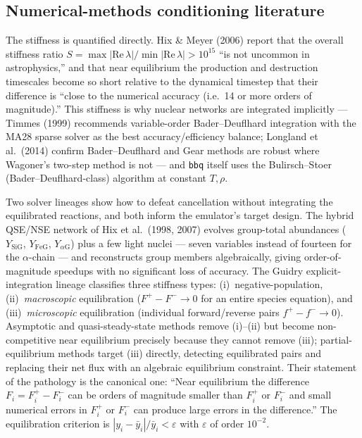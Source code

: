 \documentclass[11pt]{article}
\begin{document}
\subsection{Numerical-methods conditioning literature}

The stiffness is quantified directly. Hix \& Meyer (2006) report that the overall stiffness ratio $S = \max|\mathrm{Re}\,\lambda|/\min|\mathrm{Re}\,\lambda| > 10^{15}$ ``is not uncommon in astrophysics,'' and that near equilibrium the production and destruction timescales become so short relative to the dynamical timestep that their difference is ``close to the numerical accuracy (i.e.\ 14 or more orders of magnitude).'' This stiffness is why nuclear networks are integrated implicitly --- Timmes (1999) recommends variable-order Bader--Deuflhard integration with the MA28 sparse solver as the best accuracy/efficiency balance; Longland et al.\ (2014) confirm Bader--Deuflhard and Gear methods are robust where Wagoner's two-step method is not --- and \texttt{bbq} itself uses the Bulirsch--Stoer (Bader--Deuflhard-class) algorithm at constant $T, \rho$.

Two solver lineages show how to defeat cancellation without integrating the equilibrated reactions, and both inform the emulator's target design. The hybrid QSE/NSE network of Hix et al.\ (1998, 2007) evolves group-total abundances ($Y_{\mathrm{SiG}}$, $Y_{\mathrm{FeG}}$, $Y_{\alpha\mathrm{G}}$) plus a few light nuclei --- seven variables instead of fourteen for the $\alpha$-chain --- and reconstructs group members algebraically, giving order-of-magnitude speedups with no significant loss of accuracy. The Guidry explicit-integration lineage classifies three stiffness types: (i)~negative-population, (ii)~\emph{macroscopic} equilibration ($F^+ - F^- \to 0$ for an entire species equation), and (iii)~\emph{microscopic} equilibration (individual forward/reverse pairs $f^+ - f^- \to 0$). Asymptotic and quasi-steady-state methods remove (i)--(ii) but become non-competitive near equilibrium precisely because they cannot remove (iii); partial-equilibrium methods target (iii) directly, detecting equilibrated pairs and replacing their net flux with an algebraic equilibrium constraint. Their statement of the pathology is the canonical one: ``Near equilibrium the difference $F_i = F_i^+ - F_i^-$ can be orders of magnitude smaller than $F_i^+$ or $F_i^-$ and small numerical errors in $F_i^+$ or $F_i^-$ can produce large errors in the difference.'' The equilibration criterion is $|y_i - \bar{y}_i|/\bar{y}_i < \varepsilon$ with $\varepsilon$ of order $10^{-2}$.
\end{document}
